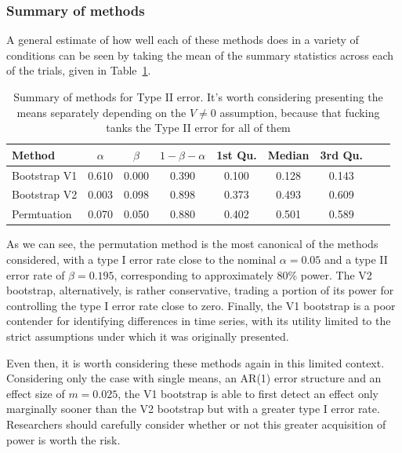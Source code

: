 \documentclass{article}
\begin{document}
\subsubsection{Summary of methods}

A general estimate of how well each of these methods does in a variety of conditions can be seen by taking the mean of the summary statistics across each of the trials, given in Table~\ref{tab:type_2_summary}.

\begin{table}[H]
\centering
\begin{tabular}{lcccccccc}
  \hline
Method & $\alpha$ & $\beta$ & $1 - \beta - \alpha$  & 1st Qu. & Median & 3rd Qu.  \\ 
  \hline
Bootstrap V1 & 0.610 & 0.000 & 0.390 & 0.100 & 0.128 & 0.143 \\ 
  Bootstrap V2 & 0.003 & 0.098 & 0.898 & 0.373 & 0.493 & 0.609 \\ 
  Permtuation & 0.070 & 0.050 & 0.880 & 0.402 & 0.501 & 0.589 \\ 
   \hline
\end{tabular}
\caption{Summary of methods for Type II error. It's worth considering presenting the means separately depending on the $V \not=0$ assumption, because that fucking tanks the Type II error for all of them} 
\label{tab:type_2_summary}
\end{table}

As we can see, the permutation method is the most canonical of the methods considered, with a type I error rate close to the nominal $\alpha = 0.05$ and a type II error rate of $\beta = 0.195$, corresponding to approximately 80\% power. The V2 bootstrap, alternatively, is rather conservative, trading a portion of its power for controlling the type I error rate close to zero. Finally, the V1 bootstrap is a poor contender for identifying differences in time series, with its utility limited to the strict assumptions under which it was originally presented.

Even then, it is worth considering these methods again in this limited context. Considering only the case with single means, an AR(1) error structure and an effect size of $m = 0.025$, the V1 bootstrap is able to first detect an effect only marginally sooner than the V2 bootstrap but with a greater type I error rate. Researchers should carefully consider whether or not this greater acquisition of power is worth the risk.
\end{document}
